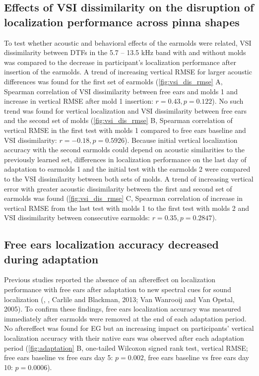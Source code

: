 \subsection{Effects of VSI dissimilarity on the disruption of localization performance across pinna shapes}

To test whether acoustic and behavioral effects of the earmolds were related, VSI dissimilarity between DTFs in the 5.7 – 13.5 kHz band with and without molds was compared to the decrease in participant’s localization performance after insertion of the earmolds. A trend of increasing vertical RMSE for larger acoustic differences was found for the first set of earmolds (\cref{fig:vsi_dis_rmse} A, Spearman correlation of VSI dissimilarity between free ears and molds 1 and increase in vertical RMSE after mold 1 insertion: $r = 0.43, p = 0.122$). No such trend was found for vertical localization and VSI dissimilarity between free ears and the second set of molds (\cref{fig:vsi_dis_rmse} B, Spearman correlation of vertical RMSE in the first test with molds 1 compared to free ears baseline and VSI dissimilarity: $r = - 0.18, p = 0.5926$). Because initial vertical localization accuracy with the second earmolds could depend on acoustic similarities to the previously learned set, differences in localization performance on the last day of adaptation to earmolds 1 and the initial test with the earmolds 2 were compared to the VSI dissimilarity between both sets of molds. A trend of increasing vertical error with greater acoustic dissimilarity between the first and second set of earmolds was found (\cref{fig:vsi_dis_rmse} C, Spearman correlation of increase in vertical RMSE from the last test with molds 1 to the first test with molds 2 and VSI dissimilarity between consecutive earmolds: $r = 0.35, p = 0.2847$). 

\subsection{Free ears localization accuracy decreased during adaptation}

Previous studies reported the absence of an aftereffect on localization performance with free ears after adaptation to new spectral cues for sound localization (\citet{hofman_relearning_1998}, \citet{trapeau_fast_2016}, Carlile and Blackman, 2013; Van Wanrooij and Van Opstal, 2005). To confirm these findings, free ears localization accuracy was measured immediately after earmolds were removed at the end of each adaptation period. No aftereffect was found for EG but an increasing impact on participants’ vertical localization accuracy with their native ears was observed after each adaptation period (\cref{fig:adaptation} B, one-tailed Wilcoxon signed rank test, vertical RMSE; free ears baseline vs free ears day 5: $p = 0.002$, free ears baseline vs free ears day 10: $p = 0.0006$). 

